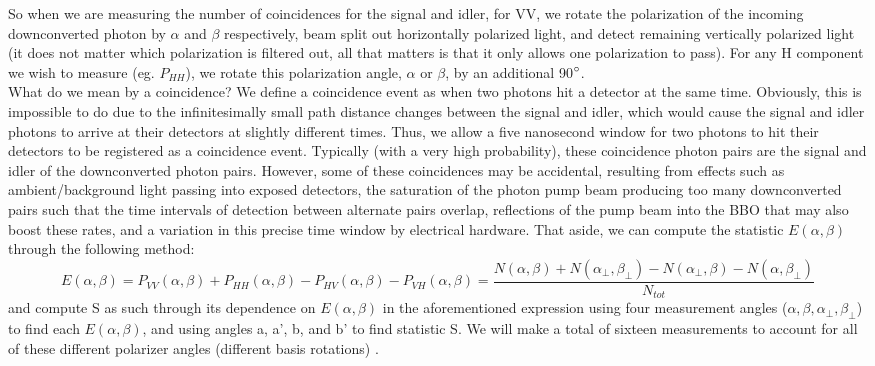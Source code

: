 \documentclass{article}
\begin{document}
    So when we are measuring the number of coincidences for the signal and idler, for VV, we rotate the polarization of the incoming downconverted photon by $\alpha$ and $\beta$ respectively, beam split out horizontally polarized light, and detect remaining vertically polarized light (it does not matter which polarization is filtered out, all that matters is that it only allows one polarization to pass). For any H component we wish to measure (eg. $P_{HH}$), we rotate this polarization angle, $\alpha$ or $\beta$, by an additional 90$\degree$.\\\indent What do we mean by a coincidence? We define a coincidence event as when two photons hit a detector at the same time. Obviously, this is impossible to do due to the infinitesimally small path distance changes between the signal and idler, which would cause the signal and idler photons to arrive at their detectors at slightly different times. Thus, we allow a five nanosecond window for two photons to hit their detectors to be registered as a coincidence event. Typically (with a very high probability), these coincidence photon pairs are the signal and idler of the downconverted photon pairs. However, some of these coincidences may be accidental, resulting from effects such as ambient/background light passing into exposed detectors, the saturation of the photon pump beam producing too many downconverted pairs such that the time intervals of detection between alternate pairs overlap, reflections of the pump beam into the BBO that may also boost these rates, and a variation in this precise time window by electrical hardware. That aside, we can compute the statistic $E(\alpha,\beta)$ through the following method:
    \begin{equation}
        E(\alpha,\beta) = P_{VV}(\alpha,\beta) + P_{HH}(\alpha,\beta) - P_{HV}(\alpha,\beta) -  P_{VH}(\alpha,\beta) = \frac{N(\alpha,\beta) + N(\alpha_\bot,\beta_\bot) - N(\alpha_\bot,\beta) - N(\alpha,\beta_\bot)}{N_{tot}}
    \end{equation}
    and compute S as such through its dependence on $E(\alpha,\beta)$ in the aforementioned expression using four measurement angles ($\alpha, \beta, \alpha_\bot, \beta_\bot$) to find each $E(\alpha,\beta)$, and using angles a, a', b, and b' to find statistic S. We will make a total of sixteen measurements to account for all of these different polarizer angles (different basis rotations) \cite{deh}.
\end{document}
